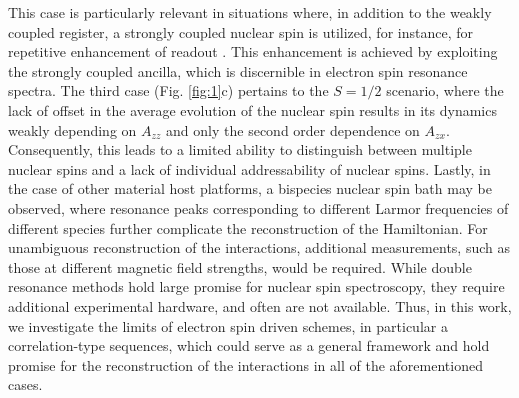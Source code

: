 \documentclass[%
 reprint,
superscriptaddress,
 amsmath,amssymb,
 aps,
]{revtex4-2}
\begin{document}
This case is particularly relevant in situations where, in addition to the weakly coupled register, a strongly coupled nuclear spin is utilized, for instance, for repetitive enhancement of readout \cite{neumann2010single}.
This enhancement is achieved by exploiting the strongly coupled ancilla, which is discernible in electron spin resonance spectra.
The third case (Fig. \ref{fig:1}c) pertains to the $S=1/2$ scenario, where the lack of offset in the average evolution of the nuclear spin results in its dynamics weakly depending on $A_{zz}$ and only the second order dependence on $A_{zx}$.
Consequently, this leads to a limited ability to distinguish between multiple nuclear spins and a lack of individual addressability of nuclear spins.
Lastly, in the case of other material host platforms, a bispecies nuclear spin bath may be observed, where resonance peaks corresponding to different Larmor frequencies of different species further complicate the reconstruction of the Hamiltonian.
For unambiguous reconstruction of the interactions, additional measurements, such as those at different magnetic field strengths, would be required.
While double resonance methods \cite{Bradley:2019aa,zaiser2016enhancing} hold large promise for nuclear spin spectroscopy, they require additional experimental hardware, and often are not available. 
Thus, in this work, we investigate the limits of electron spin driven schemes, in particular a correlation-type sequences, which could serve as a general framework and hold promise for the reconstruction of the interactions in all of the aforementioned cases.  
 




\end{document}
